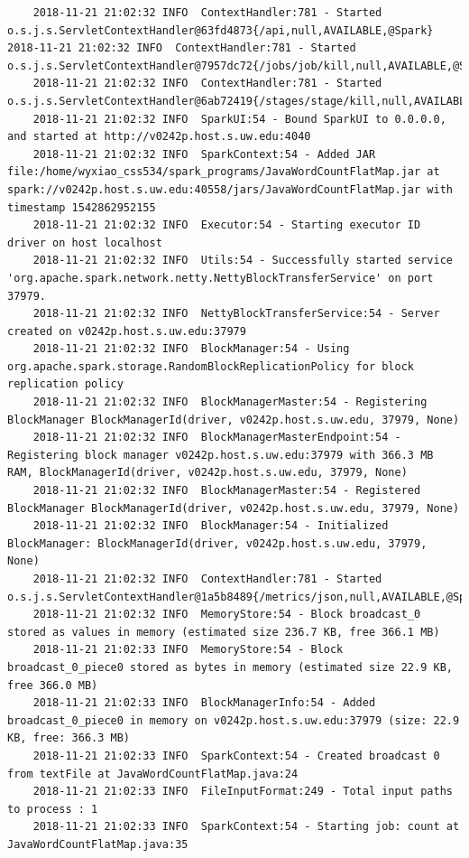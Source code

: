 \documentclass[11pt, letterpaper]{article}
\begin{document}
\begin{lstlisting}
	2018-11-21 21:02:32 INFO  ContextHandler:781 - Started o.s.j.s.ServletContextHandler@63fd4873{/api,null,AVAILABLE,@Spark} 2018-11-21 21:02:32 INFO  ContextHandler:781 - Started o.s.j.s.ServletContextHandler@7957dc72{/jobs/job/kill,null,AVAILABLE,@Spark}
	2018-11-21 21:02:32 INFO  ContextHandler:781 - Started o.s.j.s.ServletContextHandler@6ab72419{/stages/stage/kill,null,AVAILABLE,@Spark}
	2018-11-21 21:02:32 INFO  SparkUI:54 - Bound SparkUI to 0.0.0.0, and started at http://v0242p.host.s.uw.edu:4040
	2018-11-21 21:02:32 INFO  SparkContext:54 - Added JAR file:/home/wyxiao_css534/spark_programs/JavaWordCountFlatMap.jar at spark://v0242p.host.s.uw.edu:40558/jars/JavaWordCountFlatMap.jar with timestamp 1542862952155
	2018-11-21 21:02:32 INFO  Executor:54 - Starting executor ID driver on host localhost
	2018-11-21 21:02:32 INFO  Utils:54 - Successfully started service 'org.apache.spark.network.netty.NettyBlockTransferService' on port 37979.
	2018-11-21 21:02:32 INFO  NettyBlockTransferService:54 - Server created on v0242p.host.s.uw.edu:37979
	2018-11-21 21:02:32 INFO  BlockManager:54 - Using org.apache.spark.storage.RandomBlockReplicationPolicy for block replication policy
	2018-11-21 21:02:32 INFO  BlockManagerMaster:54 - Registering BlockManager BlockManagerId(driver, v0242p.host.s.uw.edu, 37979, None)
	2018-11-21 21:02:32 INFO  BlockManagerMasterEndpoint:54 - Registering block manager v0242p.host.s.uw.edu:37979 with 366.3 MB RAM, BlockManagerId(driver, v0242p.host.s.uw.edu, 37979, None)
	2018-11-21 21:02:32 INFO  BlockManagerMaster:54 - Registered BlockManager BlockManagerId(driver, v0242p.host.s.uw.edu, 37979, None)
	2018-11-21 21:02:32 INFO  BlockManager:54 - Initialized BlockManager: BlockManagerId(driver, v0242p.host.s.uw.edu, 37979, None)
	2018-11-21 21:02:32 INFO  ContextHandler:781 - Started o.s.j.s.ServletContextHandler@1a5b8489{/metrics/json,null,AVAILABLE,@Spark}
	2018-11-21 21:02:32 INFO  MemoryStore:54 - Block broadcast_0 stored as values in memory (estimated size 236.7 KB, free 366.1 MB)
	2018-11-21 21:02:33 INFO  MemoryStore:54 - Block broadcast_0_piece0 stored as bytes in memory (estimated size 22.9 KB, free 366.0 MB)
	2018-11-21 21:02:33 INFO  BlockManagerInfo:54 - Added broadcast_0_piece0 in memory on v0242p.host.s.uw.edu:37979 (size: 22.9 KB, free: 366.3 MB)
	2018-11-21 21:02:33 INFO  SparkContext:54 - Created broadcast 0 from textFile at JavaWordCountFlatMap.java:24
	2018-11-21 21:02:33 INFO  FileInputFormat:249 - Total input paths to process : 1
	2018-11-21 21:02:33 INFO  SparkContext:54 - Starting job: count at JavaWordCountFlatMap.java:35

\end{lstlisting}
\end{document}
